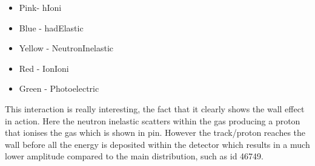 \documentclass[a4paper]{article}
\begin{document}
\begin{itemize}
    \item[] Pink- hIoni
    \item[] Blue - hadElastic
    \item[] Yellow - NeutronInelastic
    \item[] Red - IonIoni
    \item[] Green - Photoelectric
\end{itemize}
\noindent This interaction is really interesting, the fact that it clearly shows the wall effect in action. Here the neutron inelastic scatters within the gas producing a proton that ionises the gas which is shown in pin. However the track/proton reaches the wall before all the energy is deposited within the detector which results in a much lower amplitude compared to the main distribution, such as id 46749.
\end{document}

